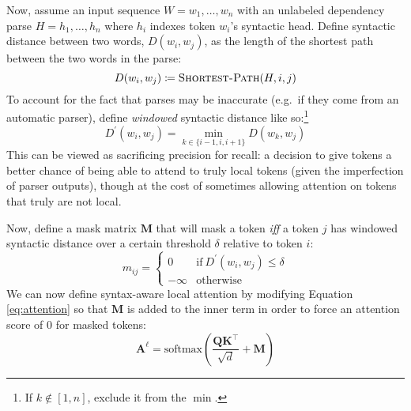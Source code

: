 \documentclass[11pt]{article}
\begin{document}
Now, assume an input sequence $W = w_1, \ldots, w_n$ with an unlabeled dependency parse $H = h_1, \ldots, h_n$ where $h_i$ indexes token $w_i$'s syntactic head.
Define syntactic distance between two words, $D(w_i, w_j)$, as the length of the shortest path between the two words in the parse:
\begin{equation}
    D(w_i, w_j) \coloneqq \textsc{Shortest-Path}(H, i, j)
\end{equation}
To account for the fact that parses may be inaccurate (e.g.~if they come from an automatic parser), define \textit{windowed} syntactic distance like so:\footnote{If $k \not\in [1, n]$, exclude it from the $\min$.}
\begin{equation}\label{eq:windowed}
    D^\prime(w_i, w_j) = \min_{k \in \{i - 1, i, i + 1\}} D(w_k, w_j)
\end{equation}
This can be viewed as sacrificing precision for recall: a decision to give tokens a better chance of being able to attend to truly local tokens (given the imperfection of parser outputs), though at the cost of sometimes allowing attention on tokens that truly are not local.

Now, define a mask matrix $\mathbf{M}$ that will mask a token \textit{iff} a token $j$ has windowed syntactic distance over a certain threshold $\delta$ relative to token $i$:
\begin{equation}
    m_{ij} = \begin{cases}
    0 & \mathrm{if}\ D^\prime(w_i, w_j) \leq \delta \\
    -\infty & \mathrm{otherwise} 
    \end{cases}
\end{equation}
We can now define syntax-aware local attention by modifying Equation \ref{eq:attention} so that $\mathbf{M}$ is added to the inner term in order to force an attention score of 0 for masked tokens:
\begin{equation}
    \mathbf{A^\ell} = \mathrm{softmax}\left(\frac{\mathbf{QK}^\top}{\sqrt{d}} + \mathbf{M} \right)
\end{equation}
\end{document}

